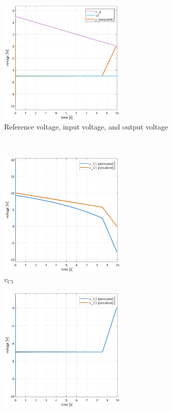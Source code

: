\begin{figure}[H]
    \begin{framed}
    \captionsetup[subfigure]{justification = centering}
    \centering
    \begin{subfigure}[b]{0.8\textwidth}
    \centering\includegraphics[height = 6cm]{figures/estimation/ref_y_ramp.pdf}
    \caption{Reference voltage, input voltage, and output voltage}
    \label{fig:estimatingconditions2}
    \end{subfigure}
    \\[11pt]
    \begin{subfigure}[b]{0.45\textwidth}
    \centering
    \includegraphics[height = 6cm]{figures/estimation/vC1_vC1b.pdf}
    \caption{$v_{C1}$}
    \label{fig:estimating2first}
    \end{subfigure}
    \hfill
    \begin{subfigure}[b]{0.45\textwidth}
    \centering
    \includegraphics[height = 6cm]{figures/estimation/vC2_vC2b.pdf}

\end{subfigure}
\end{framed}
\end{figure}
